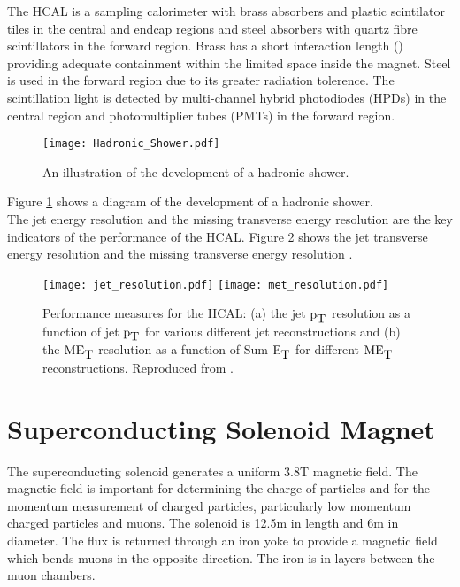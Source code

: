 The HCAL is a sampling calorimeter with brass absorbers and plastic scintilator
tiles in the central and endcap regions and steel absorbers with quartz fibre 
scintillators in the forward region. Brass has a short interaction length () 
providing adequate containment within the limited space inside the magnet. Steel 
is used in the forward region due to its greater radiation tolerence. The 
scintillation light is detected by multi-channel hybrid photodiodes (HPDs) in 
the central region and photomultiplier tubes (PMTs) in the forward region. \\

\begin{figure}
\begin{center}
\texttt{[image: Hadronic\_Shower.pdf]}
\end{center}
\caption{An illustration of the development of a hadronic shower.}
\label{fig:hadronic_shower}
\end{figure}

Figure \ref{fig:hadronic_shower} shows a diagram of the development of a
hadronic shower. \\

The jet energy resolution and the missing transverse energy resolution are the 
key indicators of the performance of the HCAL. Figure \ref{fig:jetmet} shows the
jet transverse energy resolution and the missing transverse energy resolution
\cite{jet_resolution, met_resolution}.

\begin{figure}
\texttt{[image: jet\_resolution.pdf]}
\texttt{[image: met\_resolution.pdf]}
\caption{Performance measures for the HCAL: (a) the jet $\mbox{p}_{\mbox{T}}$ resolution as a 
function of jet $\mbox{p}_{\mbox{T}}$ for various different jet reconstructions and (b) the 
$\mbox{ME}_{\mbox{T}}$ resolution as a function of Sum $\mbox{E}_{\mbox{T}}$ for different $\mbox{ME}_{\mbox{T}}$
reconstructions. Reproduced from \cite{jet_resolution, met_resolution}.}
\label{fig:jetmet}
\end{figure}

\section{Superconducting Solenoid Magnet}

The superconducting solenoid generates a uniform 3.8T magnetic field. The 
magnetic field is important for determining the charge of particles and for the 
momentum measurement of charged particles, particularly low momentum charged 
particles and muons. The solenoid is 12.5m in length and 6m in diameter. The flux 
is returned through an iron yoke to provide a magnetic field which bends muons in 
the opposite direction. The iron is in layers between the muon chambers. \\

